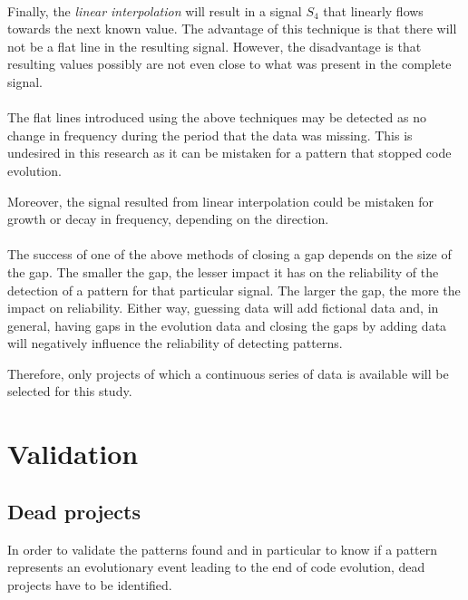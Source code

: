\paragraph{}
Finally, the \textit{linear interpolation} will result in a signal $S_{4}$ that
linearly flows towards the next known value. The advantage of this technique is
that there will not be a flat line in the resulting signal. However, the
disadvantage is that resulting values possibly are not even close to what was
present in the complete signal.

\paragraph{}
The flat lines introduced using the above techniques may be detected as no
change in frequency during the period that the data was missing. This is
undesired in this research as it can be mistaken for a pattern that stopped
code evolution.

Moreover, the signal resulted from linear interpolation could be mistaken for
growth or decay in frequency, depending on the direction.

\paragraph{}
The success of one of the above methods of closing a gap depends on the size of
the gap. The smaller the gap, the lesser impact it has on the reliability of
the detection of a pattern for that particular signal. The larger the gap, the
more the impact on reliability. Either way, guessing data will add fictional
data and, in general, having gaps in the evolution data and closing the gaps by
adding data will negatively influence the reliability of detecting patterns.

Therefore, only projects of which a continuous series of data is available will
be selected for this study.

\section{Validation}
\subsection{Dead projects}
\label{method:validation}
In order to validate the patterns found and in particular to know if a pattern
represents an evolutionary event leading to the end of code evolution, dead
projects have to be identified.\\

